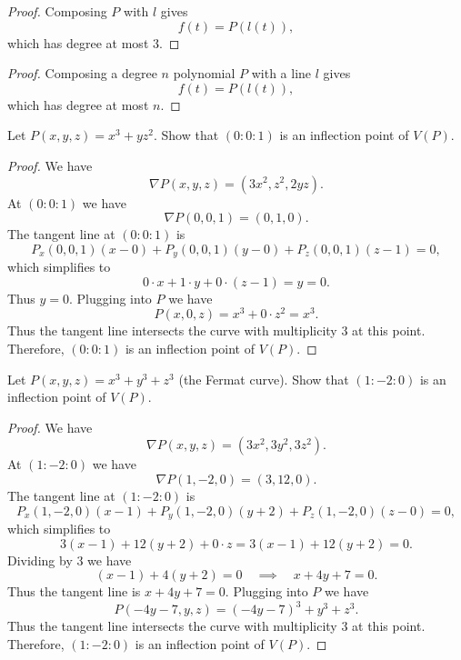 \begin{proof}
    Composing $P$ with $l$ gives
    \[
        f(t) = P(l(t)),
    \] 
    which has degree at most $3$. 
\end{proof}

\begin{proof}
    Composing a degree $n$ polynomial $P$ with a line $l$ gives 
    \[
        f(t) = P(l(t)),
    \] 
    which has degree at most $n$.
\end{proof}


\begin{tcolorbox}[title=Problem 20, breakable]
    Let $P(x, y, z) = x^3 + y z^2$. Show that $(0 : 0 : 1)$ is an inflection 
    point of $V(P)$.
\end{tcolorbox}

\begin{proof}
    We have
    \[
    \nabla P(x, y, z) = (3x^2, z^2, 2yz).
    \]
    At $(0 : 0 : 1)$ we have 
    \[
    \nabla P(0, 0, 1) = (0, 1, 0).
    \]
    The tangent line at $(0:0:1)$ is
    \[
    P_x(0,0,1) (x-0) + P_y(0,0,1) (y-0) + P_z(0,0,1) (z-1) = 0,
    \]
    which simplifies to
    \[
    0 \cdot x + 1 \cdot y + 0 \cdot (z-1) = y = 0.
    \]
    Thus $y = 0$.  
    Plugging into $P$ we have
    \[
    P(x,0,z) = x^3 + 0 \cdot z^2 = x^3.
    \]
    Thus the tangent line intersects the curve with multiplicity $3$ at this point.  
    Therefore, $(0:0:1)$ is an inflection point of $V(P)$.
\end{proof}

\begin{tcolorbox}[title=Problem 21, breakable]
    Let $P(x, y, z) = x^3 + y^3 + z^3$ (the Fermat curve).
    Show that $(1 : -2 : 0)$ is an inflection point of $V(P)$.
\end{tcolorbox}

\begin{proof}
    We have
    \[
    \nabla P(x, y, z) = (3x^2, 3y^2, 3z^2).
    \]
    At $(1 : -2 : 0)$ we have 
    \[
    \nabla P(1, -2, 0) = (3, 12, 0).
    \]
    The tangent line at $(1:-2:0)$ is
    \[
    P_x(1,-2,0) (x-1) + P_y(1,-2,0) (y+2) + P_z(1,-2,0) (z-0) = 0,
    \]
    which simplifies to
    \[
    3(x-1) + 12(y+2) + 0 \cdot z = 3(x-1) + 12(y+2) = 0.
    \]
    Dividing by $3$ we have
    \[
    (x-1) + 4(y+2) = 0 \quad \implies \quad x + 4y + 7 = 0.
    \]
    Thus the tangent line is $x + 4y + 7 = 0$.  
    Plugging into $P$ we have
    \[
    P(-4y-7, y, z) = (-4y-7)^3 + y^3 + z^3.
    \]
    Thus the tangent line intersects the curve with multiplicity $3$ at this point.  
    Therefore, $(1:-2:0)$ is an inflection point of $V(P)$.
\end{proof}

